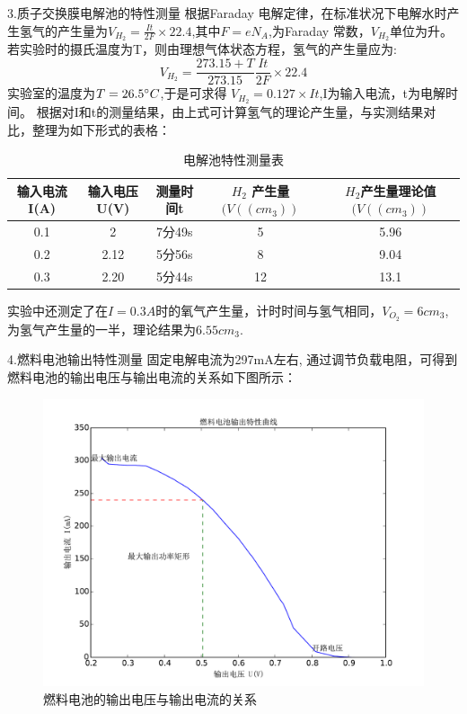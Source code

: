 ﻿\documentclass[10.5pt]{ctexart}
\begin{document}
3.质子交换膜电解池的特性测量
根据Faraday 电解定律，在标准状况下电解水时产生氢气的产生量为$V_{H_2}=\frac{It}{2F}\times 22.4$,其中$F=e N_A$,为Faraday 常数，$V_{H_2}$单位为升。
若实验时的摄氏温度为T，则由理想气体状态方程，氢气的产生量应为:
\begin{equation}
V_{H_2}=\frac{273.15+T}{273.15} \frac{It}{2F} \times 22.4
\end{equation}
实验室的温度为$T=26.5 \degree C$,于是可求得
$V_{H_2}=0.127 \times It$,I为输入电流，t为电解时间。
根据对I和t的测量结果，由上式可计算氢气的理论产生量，与实测结果对比，整理为如下形式的表格：
\begin{table}
\centering
\begin{tabular}{ccccc}
\hline
输入电流 I(A)&输入电压U(V)&测量时间t& $H_2$ 产生量$(V(({cm}_3))$&$H_2$产生量理论值$(V(({cm}_3))$\\
\hline
0.1&2&7分49s&5&5.96\\
0.2&2.12&5分56s&8&9.04\\
0.3&2.20&5分44s&12&13.1\\
\hline
\end{tabular}
\caption{电解池特性测量表}
\end{table}

实验中还测定了在$I=0.3A$时的氧气产生量，计时时间与氢气相同，$V_{O_2}=6 {cm}_3$,为氢气产生量的一半，理论结果为$6.55 {cm}_3$.


4.燃料电池输出特性测量
固定电解电流为297mA左右, 通过调节负载电阻，可得到燃料电池的输出电压与输出电流的关系如下图所示：
\begin{figure}[!ht]
\centering
\caption{燃料电池的输出电压与输出电流的关系}
\includegraphics[width=400pt]{figure_1.pdf}
\end{figure}
\newline
\end{document}
